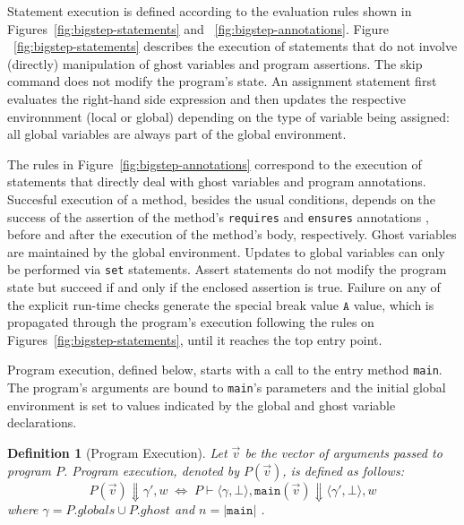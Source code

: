 \documentclass[10pt,notitlepage,twoside]{article}
\newcommand{\assertval}[1]{\texttt{A}}
\newcommand{\eval}[2]{P \vdash #1 \Downarrow #2}
\newcommand{\state}[1]{\langle #1 \rangle}
\newcommand{\genv}{\gamma}
\newtheorem{definition}{Definition}
\begin{document}


Statement execution is defined according to the evaluation rules shown in Figures~\ref{fig:bigstep-statements} and ~\ref{fig:bigstep-annotations}.
Figure ~\ref{fig:bigstep-statements} describes the execution of statements that do not involve (directly) manipulation of ghost variables and program assertions.
The skip command does not modify the program's state. An assignment statement first evaluates the right-hand side expression and then updates the respective environnment (local or global) depending on the type of variable being assigned: all global variables are always part of the global environment. 




The rules in Figure~\ref{fig:bigstep-annotations} correspond to the execution of statements that directly deal with ghost variables and program annotations. 
Succesful execution of a method, besides the usual conditions,  depends on the success of the assertion of the method's \texttt{requires} and \texttt{ensures} annotations , before and after the execution of the method's body, respectively.
Ghost variables are maintained by the global environment.
Updates to global variables can only be performed via \texttt{set} statements.
Assert statements do not modify the program state but succeed if and only if the enclosed assertion is true.
Failure on any of the explicit run-time checks generate the special break value $\assertval{}$ value, which is propagated through the program's execution following the rules on Figures~\ref{fig:bigstep-statements}, until it reaches the top entry point.


Program execution, defined below, starts with a call to the entry method \texttt{main}. The program's arguments are  bound to \texttt{main}'s parameters and the initial global environment is  set to values indicated by the global and ghost variable declarations.

\begin{definition}[Program Execution]
Let $\vec{v}$ be the vector of arguments passed to program $P$. Program execution, denoted by $P(\vec{v})$, is defined as follows:
\begin{displaymath}
P(\vec{v}) \Downarrow \genv',w \;\Leftrightarrow\; \eval{\state{\genv,\bot},\texttt{main}(\vec{v})}{\state{\genv',\bot},w} 
\end{displaymath}
where $\genv = P.\mathit{globals} \cup P.\mathit{ghost}$ and $n = |\texttt{main}|$ .
\end{definition}
\end{document}
